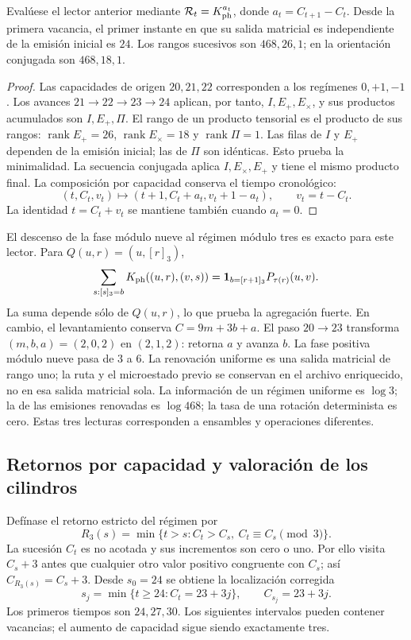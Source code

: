 \begin{proposition}
\label{prop:ii-ter27-renovacion}
Evalúese el lector anterior mediante $\mathcal R_t=K_{\rm ph}^{a_t}$,
donde $a_t=C_{t+1}-C_t$. Desde la primera vacancia, el primer instante en
que su salida matricial es independiente de la emisión inicial es $24$.
Los rangos sucesivos son $468,26,1$; en la orientación conjugada son
$468,18,1$.
\end{proposition}
\begin{proof}
Las capacidades de origen $20,21,22$ corresponden a los regímenes
$0,+1,-1$. Los avances $21\to22\to23\to24$ aplican, por tanto,
$I,E_+,E_\times$, y sus productos acumulados son $I,E_+,\Pi$.
El rango de un producto tensorial es el producto de sus rangos:
$\operatorname{rank}E_+=26$, $\operatorname{rank}E_\times=18$ y
$\operatorname{rank}\Pi=1$. Las filas de $I$ y $E_+$ dependen de la
emisión inicial; las de $\Pi$ son idénticas. Esto prueba la minimalidad.
La secuencia conjugada aplica $I,E_\times,E_+$ y tiene el mismo producto
final. La composición por capacidad conserva el tiempo cronológico:
\[
 (t,C_t,v_t)\mapsto(t+1,C_t+a_t,v_t+1-a_t),\qquad v_t=t-C_t.
\]
La identidad $t=C_t+v_t$ se mantiene también cuando $a_t=0$.
\end{proof}

El descenso de la fase módulo nueve al régimen módulo tres es exacto
para este lector. Para $Q(u,r)=(u,[r]_3)$,
\[
 \sum_{s:[s]_3=b}K_{\rm ph}((u,r),(v,s))
 =\mathbf1_{b=[r+1]_3}P_{\tau(r)}(u,v).
\]
La suma depende sólo de $Q(u,r)$, lo que prueba la agregación fuerte.
En cambio, el levantamiento conserva $C=9m+3b+a$. El paso $20\to23$
transforma $(m,b,a)=(2,0,2)$ en $(2,1,2)$: retorna $a$ y avanza $b$.
La fase positiva módulo nueve pasa de $3$ a $6$. La renovación uniforme
es una salida matricial de rango uno; la ruta y el microestado previo se
conservan en el archivo enriquecido, no en esa salida matricial sola.
La información de un régimen uniforme es $\log3$; la de las emisiones
renovadas es $\log468$; la tasa de una rotación determinista es cero.
Estas tres lecturas corresponden a ensambles y operaciones diferentes.

\subsection{Retornos por capacidad y valoración de los cilindros}
\label{sec:ii-ter27-cociclo}

Defínase el retorno estricto del régimen por
\[
 R_3(s)=\min\{t>s:C_t>C_s,\ C_t\equiv C_s\pmod3\}.
\]
La sucesión $C_t$ es no acotada y sus incrementos son cero o uno.
Por ello visita $C_s+3$ antes que cualquier otro valor positivo congruente
con $C_s$; así $C_{R_3(s)}=C_s+3$. Desde $s_0=24$ se obtiene la
localización corregida
\begin{equation}
 s_j=\min\{t\geq24:C_t=23+3j\},\qquad C_{s_j}=23+3j.
 \label{eq:ii-ter27-localizacion}
\end{equation}
Los primeros tiempos son $24,27,30$. Los siguientes intervalos pueden
contener vacancias; el aumento de capacidad sigue siendo exactamente tres.

